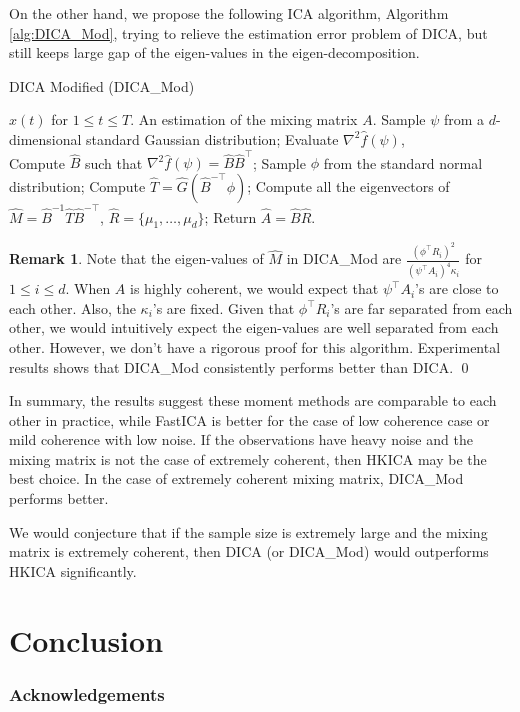 \documentclass[twoside]{article}
\theoremstyle{definition}
\newtheorem{remark}[lemma]{Remark}
\begin{document}
On the other hand, we propose the following ICA algorithm, Algorithm \ref{alg:DICA_Mod}, trying to relieve the estimation error problem of DICA, but still keeps large gap of the eigen-values in the eigen-decomposition. 
\begin{algorithm} 
\caption{DICA Modified (DICA\_Mod)}
\label{alg:DICA_Mod}
\begin{algorithmic}[1]
\INPUT $x(t)$ for $1\le t \le T$. 
\OUTPUT An estimation of the mixing matrix $A$. 
\STATE Sample $\psi$ from a $d$-dimensional standard Gaussian distribution;
\STATE Evaluate $\nabla^2\widehat{f}(\psi)$, \\
\STATE Compute $\widehat{B}$ such that $\nabla^2\widehat{f}(\psi) = \widehat{B}\widehat{B}^{\top}$;
\STATE Sample $\phi$ from the standard normal distribution;
\STATE Compute $\widehat{T} = \widehat{G}(\widehat{B}^{-\top}\phi)$;
\STATE Compute all the eigenvectors of $\widehat{M} = \widehat{B}^{-1}\widehat{T}\widehat{B}^{-\top}$, $\widehat{R} = \{\mu_1,\ldots,\mu_d\}$;
\STATE Return $\widehat{A} = \widehat{B}\widehat{R}$.
\end{algorithmic}
\end{algorithm}
\begin{remark}
Note that the eigen-values of $\widehat{M}$ in DICA\_Mod are $\frac{(\phi^{\top}R_i)^2}{(\psi^{\top}A_i)^4\kappa_i}$ for $1\le i\le d$. 
When $A$ is highly coherent, we would expect that $\psi^{\top}A_i$'s are close to each other. Also, the $\kappa_i$'s are fixed. 
Given that $\phi^{\top}R_i$'s are far separated from each other, we would intuitively expect the eigen-values are well separated from each other. 
However, we don't have a rigorous proof for this algorithm.
Experimental results shows that DICA\_Mod consistently performs better than DICA. \qed
\end{remark}
In summary, the results suggest these moment methods are comparable to each other in practice,
while FastICA  is better for the case of low coherence case or mild coherence with low noise.
If the observations have heavy noise and the mixing matrix is not the case of extremely coherent, then HKICA may be the best choice.
In the case of extremely coherent mixing matrix, DICA\_Mod performs better.




We would conjecture that if the sample size is extremely large and the mixing matrix is extremely coherent, then DICA (or DICA\_Mod) would outperforms HKICA significantly.
\fi 
\section{Conclusion}



\subsubsection*{Acknowledgements}


\newpage 




\end{document}
